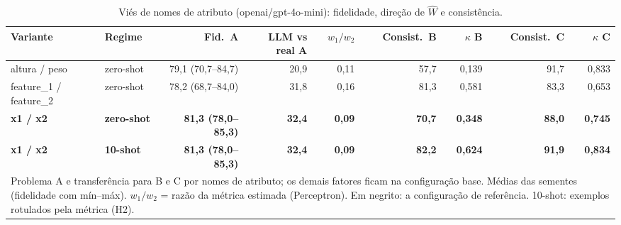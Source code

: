 \begin{table}[htbp]
\centering
\small
\caption{Viés de nomes de atributo (openai/gpt-4o-mini): fidelidade, direção de $\hat{W}$ e consistência.}
\label{tab:bloco1_vies_nomes_atributo_gpt4mini}
\begin{tabular}{llrrrrrrr}
\toprule
Variante & Regime & Fid.\ A & LLM vs real A & $w_1/w_2$ & Consist.\ B & $\kappa$ B & Consist.\ C & $\kappa$ C \\
\midrule
altura / peso & zero-shot & 79,1 (70,7–84,7) & 20,9 & 0,11 & 57,7 & 0,139 & 91,7 & 0,833 \\
feature\_1 / feature\_2 & zero-shot & 78,2 (68,7–84,0) & 31,8 & 0,16 & 81,3 & 0,581 & 83,3 & 0,653 \\
\textbf{x1 / x2} & \textbf{zero-shot} & \textbf{81,3 (78,0–85,3)} & \textbf{32,4} & \textbf{0,09} & \textbf{70,7} & \textbf{0,348} & \textbf{88,0} & \textbf{0,745} \\
\midrule
\textbf{x1 / x2} & \textbf{10-shot} & \textbf{81,3 (78,0–85,3)} & \textbf{32,4} & \textbf{0,09} & \textbf{82,2} & \textbf{0,624} & \textbf{91,9} & \textbf{0,834} \\
\bottomrule
\multicolumn{9}{p{0.95\linewidth}}{\footnotesize Problema A e transferência para B e C por nomes de atributo; os demais fatores ficam na configuração base. Médias das sementes (fidelidade com mín–máx). $w_1/w_2$ = razão da métrica estimada (Perceptron). Em negrito: a configuração de referência. 10-shot: exemplos rotulados pela métrica (H2).} \\
\end{tabular}
\end{table}
